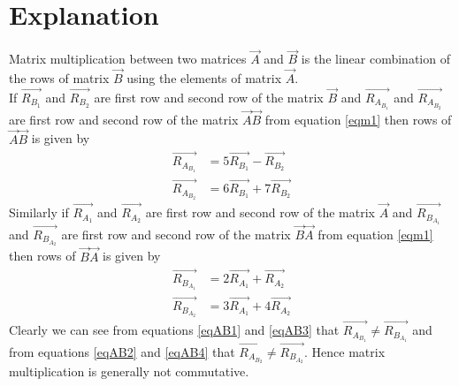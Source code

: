 \documentclass[journal,12pt,twocolumn]{IEEEtran}
\begin{document}
\section{\textbf{Explanation}}
Matrix multiplication between two matrices $\vec{A}$ and $\vec{B}$ is the linear combination of the rows of matrix $\vec{B}$ using the elements of matrix $\vec{A}$. \\
If $\vec{R_B_1}$ and $\vec{R_B_2}$ are first row and second row of the matrix $\vec{B}$ and $\vec{R_A_B_1}$ and $\vec{R_A_B_2}$ are first row and second row of the matrix $\vec{A}\vec{B}$ from equation \ref{eqm1} then rows of $\vec{A}\vec{B}$ is given by
\begin{align}
\vec{R_A_B_1} &= 5\vec{R_B_1}-\vec{R_B_2}\label{eqAB1}\\
\vec{R_A_B_2} &= 6\vec{R_B_1}+7\vec{R_B_2}\label{eqAB2}
\end{align}
Similarly if $\vec{R_A_1}$ and $\vec{R_A_2}$ are first row and second row of the matrix $\vec{A}$ and $\vec{R_B_A_1}$ and $\vec{R_B_A_2}$ are first row and second row of the matrix $\vec{B}\vec{A}$ from equation \ref{eqm1} then rows of $\vec{B}\vec{A}$ is given by
\begin{align}
\vec{R_B_A_1} &= 2\vec{R_A_1}+\vec{R_A_2}\label{eqAB3}\\
\vec{R_B_A_2} &= 3\vec{R_A_1}+4\vec{R_A_2}\label{eqAB4}
\end{align}
Clearly we can see from equations \ref{eqAB1} and \ref{eqAB3} that $\vec{R_A_B_1}\not=\vec{R_B_A_1}$ and from equations \ref{eqAB2} and \ref{eqAB4} that $\vec{R_A_B_2}\not=\vec{R_B_A_2}$. Hence matrix multiplication is generally not commutative.\\
\begin{comment}
\textbf{Python Code: }The code for the solution can be found at \url{https://github.com/Arko98/EE5609/blob/master/Assignment_2/Codes/Figure.py}
\end{comment}
\end{document}
